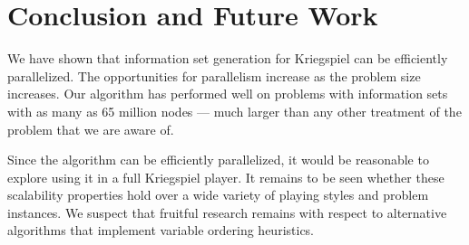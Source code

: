 \documentclass[10pt, conference, compsocconf]{IEEEtran}
\begin{document}
%

\section{Conclusion and Future Work}
We have shown that information set generation for Kriegspiel can be efficiently
parallelized.  The opportunities for parallelism increase as the problem size
increases.  Our algorithm has performed well on problems with information sets
with as many as 65 million nodes --- much larger than any other treatment of the
problem that we are aware of.  

Since the algorithm can be efficiently
parallelized, it would be reasonable to explore using it in a full Kriegspiel
player.  It remains to be seen whether these scalability properties hold over a
wide variety of playing styles and problem instances.  We suspect that fruitful
research remains with respect to alternative algorithms that implement variable
ordering heuristics.
\end{document}
